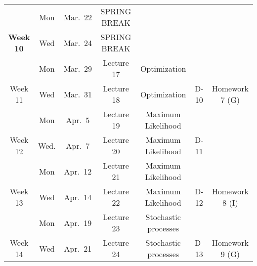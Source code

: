 \documentclass[12pt]{article}
\newcommand{\tro}{\mbox{D}}
\begin{document}
{\begin{tabular}{ccccccc}
  \hline
           & Mon & Mar.~22  &   SPRING BREAK  & &  &\\
  \bf{ Week 10}    & Wed& Mar.~24  &   SPRING BREAK &    & & \\

  \hline
          & Mon & Mar.~29   & Lecture 17 & Optimization& &  \\
    Week 11   & Wed & Mar.~31  &   Lecture 18 &  Optimization  & D-10 & Homework 7 (G)\\

  \hline
  & Mon & Apr.~5   & Lecture 19  &Maximum Likelihood &  &  \\
{  Week 12 }  & Wed. & Apr.~7  &    Lecture 20 &Maximum Likelihood    &  D-11 &  \\
  \hline
        & Mon & Apr.~12 &  Lecture 21  &  Maximum Likelihood   &   &\\
 {Week 13}    & Wed & Apr.~14  &  Lecture 22&   Maximum Likelihood & D-12 & Homework 8 (I)\\
  \hline
           & Mon & Apr.~19  & Lecture 23  & Stochastic processes &   &  \\
   { Week 14}   & Wed & Apr.~21  &   Lecture 24 &  Stochastic processes & D-13& Homework 9 (G)  \\


\end{tabular}}
\end{document}
